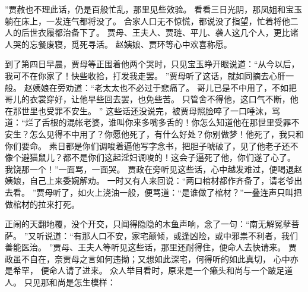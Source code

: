 ”贾赦也不理此话，仍是百般忙乱，那里见些效验。
看看三日光阴，那凤姐和宝玉躺在床上，一发连气都将没了。
合家人口无不惊慌，都说没了指望，忙着将他二人的后世衣履都治备下了。
贾母、王夫人、贾琏、平儿、袭人这几个人，更比诸人哭的忘餐废寝，觅死寻活。
赵姨娘、贾环等心中欢喜称愿。
\par
到了第四日早晨，贾母等正围着他两个哭时，只见宝玉睁开眼说道：“从今以后，我可不在你家了！快些收拾，打发我走罢。
”贾母听了这话，就如同摘去心肝一般。
赵姨娘在旁劝道：“老太太也不必过于悲痛了。
哥儿已是不中用了，不如把哥儿的衣裳穿好，让他早些回去罢，也免些苦。
只管舍不得他，这口气不断，他在那世里也受罪不安生。
”
这些话还没说完，被贾母照脸啐了一口唾沫，骂道：“烂了舌根的混帐老婆，谁叫你来多嘴多舌的！你怎么知道他在那世里受罪不安生？怎么见得不中用了？你愿他死了，有什么好处？你别做梦！他死了，我只和你们要命。
素日都是你们调唆着逼他写字念书，把胆子唬破了，见了他老子还不像个避猫鼠儿？都不是你们这起淫妇调唆的！这会子逼死了他，你们遂了心了。
我饶那一个！”一面骂，一面哭。
贾政在旁听见这些话，心中越发难过，便喝退赵姨娘，自己上来委婉解劝。
一时又有人来回说：“两口棺材都作齐备了，请老爷出去看。
”贾母听了，如火上浇油一般，便骂道：“是谁做了棺材？”一叠连声只叫把做棺材的拉来打死。
\par
正闹的天翻地覆，没个开交，只闻得隐隐的木鱼声响，念了一句：“南无解冤孽菩萨。
”又听说道：“有那人口不安，家宅颠倾，或逢凶险，或中邪祟不利者，我们善能医治。
”贾母、王夫人等听见这些话，那里还耐得住，便命人去快请来。
贾政虽不自在，奈贾母之言如何违拗；又想如此深宅，何得听的如此真切， 
心中亦是希罕，
便命人请了进来。
众人举目看时，原来是一个癞头和尚与一个跛足道人。
只见那和尚是怎生模样：\par

